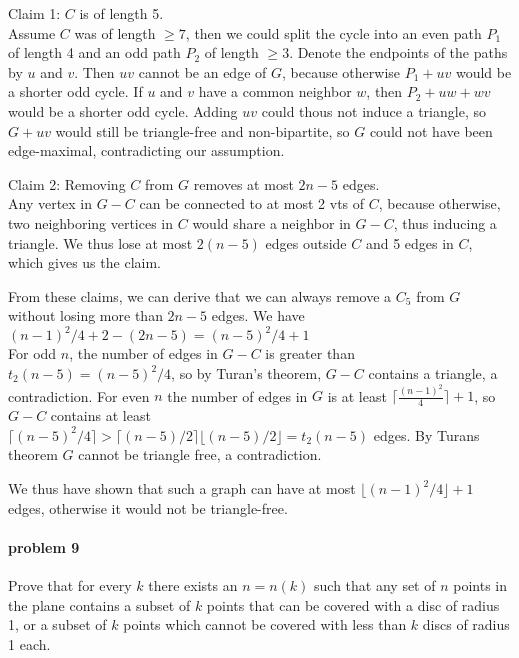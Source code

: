     \smallskip \noindent
    Claim 1: $C$ is of length 5. \\
    Assume $C$ was of length $\geq 7$, then we could split the cycle into an
    even path $P_1$ of length 4 and an odd path $P_2$ of length $\geq 3$. 
    Denote the endpoints of the paths by $u$ and $v$. Then $uv$ cannot be an 
    edge of $G$, because otherwise $P_1 + uv$ would be a shorter odd cycle.
    If $u$ and $v$ have a common neighbor $w$, then $P_2 + uw + wv$ would be 
    a shorter odd cycle. Adding $uv$ could thous not induce a triangle, so 
    $G +uv$ would still be triangle-free and non-bipartite, so $G$ could not 
    have been edge-maximal, contradicting our assumption.

    \smallskip \noindent
    Claim 2: Removing $C$ from $G$ removes at most $2n-5$ edges. \\
    Any vertex in $G-C$ can be connected to at most 2 vts of $C$, because
    otherwise, two neighboring vertices in $C$ would share a neighbor in $G-C$,
    thus inducing a triangle. We thus lose at most $2(n-5)$ edges outside $C$
    and 5 edges in $C$, which gives us the claim.

    \smallskip \noindent
    From these claims, we can derive that we can always remove a $C_5$ from $G$
    without losing more than $2n-5$ edges. We have $(n-1)^2/4 + 2 - (2n-5) 
    = (n-5)^2 / 4 + 1$ \\
    For odd $n$, the number of edges in $G-C$ is greater than 
    $t_2(n-5) = (n-5)^2/4$, so by Turan's theorem, $G-C$ contains a triangle,
    a contradiction. For even $n$ the number of edges in $G$ is 
    at least $\lceil\frac{(n-1)^2}{4}\rceil +1$, so $G-C$ contains at least 
    $\lceil(n-5)^2/4\rceil >  \lceil(n-5)/2\rceil \lfloor(n-5)/2\rfloor 
    = t_2(n-5)$ edges. By Turans theorem $G$ cannot be triangle free, a 
    contradiction.

    \smallskip
    We thus have shown that such a graph can have at most 
    $\lfloor(n-1)^2/4\rfloor + 1$ edges, otherwise it would not be 
    triangle-free.



\paragraph{problem 9}
    Prove that for every $k$ there exists an $n = n(k)$ such that any set of 
    $n$ points in the plane contains a subset of $k$ points that can be 
    covered with a disc of radius 1, or a subset of $k$ points which cannot 
    be covered with less than $k$ discs of radius 1 each.

